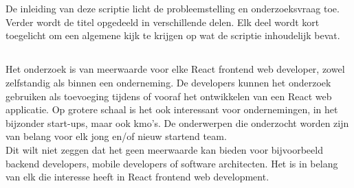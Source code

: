
\chapter{}
\label{ch:inleiding}

De inleiding van deze scriptie licht de probleemstelling en onderzoeksvraag toe. Verder wordt de titel opgedeeld in verschillende delen. Elk deel wordt kort toegelicht om een algemene kijk te krijgen op wat de scriptie inhoudelijk bevat.\\

\section{}
\label{sec:probleemstelling}

Het onderzoek is van meerwaarde voor elke React frontend web developer, zowel zelfstandig als binnen een onderneming. De developers kunnen het onderzoek gebruiken als toevoeging tijdens of vooraf het ontwikkelen van een React web applicatie. Op grotere schaal is het ook interessant voor ondernemingen, in het bijzonder start-ups, maar ook \gls{kmo}'s. De onderwerpen die onderzocht worden zijn van belang voor elk jong en/of nieuw startend team.\\
Dit wilt niet zeggen dat het geen meerwaarde kan bieden voor bijvoorbeeld backend developers, mobile developers of software architecten. Het is in belang van elk die interesse heeft in React frontend web development.

\section{}
\label{sec:onderzoeksvraag}

